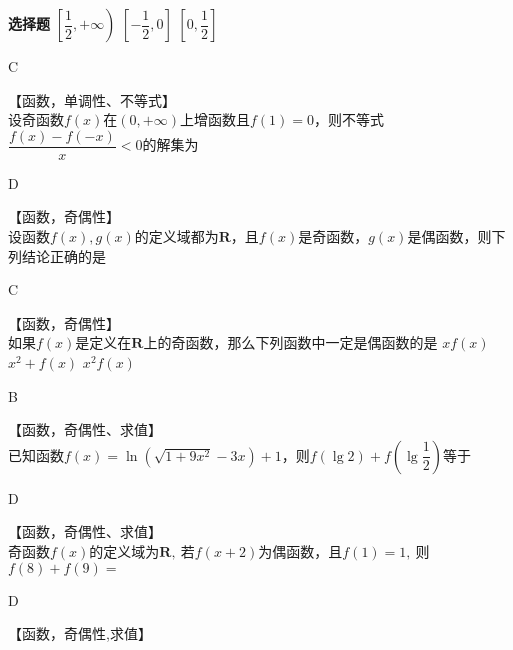 \begin{exercise}{\bf 选择题}
      \xx{$\left(-\infty,\dfrac{1}2\right]$}
        {$\left[\dfrac{1}2,+\infty\right)$}
        {$\left[-\dfrac{1}2,0\right]$}
        {$\left[0,\dfrac{1}2\right]$}
      \begin{answer}
        C
      \end{answer}
    \item 【函数，单调性、不等式】\\
      设奇函数$f(x)$在$ \left(0,+\infty\right) $上增函数且$ f(1)=0 $，则不等式$ \dfrac{f(x)-f(-x)}{x}<0 $的解集为\xz
      \begin{answer}
        D
      \end{answer}
    \item 【函数，奇偶性】\\
      设函数$f(x),g(x)$的定义域都为$\mathbf{R}$，且$f(x)$是奇函数，$g(x)$是偶函数，则下列结论正确的是\xz
      \begin{answer}
        C
      \end{answer}
    \item 【函数，奇偶性】\\
      如果$f(x)$是定义在$\mathbf{R}$上的奇函数，那么下列函数中一定是偶函数的是\xz
       {$ xf(x)$}
       {$ x^2+f(x)$}
       {$ x^2f(x)$}
      \begin{answer}
        B
      \end{answer}
    \item 【函数，奇偶性、求值】\\
      已知函数$f(x)=\ln \left(\sqrt{1+9x^2}-3x\right)+1$，则$ f(\lg2)+f\left(\lg\dfrac{1}{2}\right) $等于\xz
      \begin{answer}
        D
      \end{answer}
    \item 【函数，奇偶性、求值】\\
      奇函数$f(x)$的定义域为$ \mathbf{R} ,~$若$ f(x+2) $为偶函数，且$ f(1)=1,~ $则 $f(8)+f(9)=$\xz
      \begin{answer}
        D
      \end{answer}
    \item 【函数，奇偶性,求值】\\

\end{exercise}
